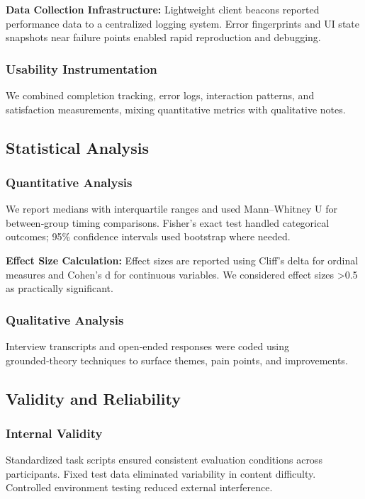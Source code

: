 \documentclass[conference]{IEEEtran}
\begin{document}
\textbf{Data Collection Infrastructure:} Lightweight client beacons reported performance data to a centralized logging system. Error fingerprints and UI state snapshots near failure points enabled rapid reproduction and debugging.

\subsubsection{Usability Instrumentation}
We combined completion tracking, error logs, interaction patterns, and satisfaction measurements, mixing quantitative metrics with qualitative notes.

\subsection{Statistical Analysis}

\subsubsection{Quantitative Analysis}
We report medians with interquartile ranges and used Mann–Whitney U for between‑group timing comparisons. Fisher's exact test handled categorical outcomes; 95\% confidence intervals used bootstrap where needed.

\textbf{Effect Size Calculation:} Effect sizes are reported using Cliff's delta for ordinal measures and Cohen's d for continuous variables. We considered effect sizes >0.5 as practically significant.

\subsubsection{Qualitative Analysis}
Interview transcripts and open‑ended responses were coded using grounded‑theory techniques to surface themes, pain points, and improvements.

\subsection{Validity and Reliability}

\subsubsection{Internal Validity}
Standardized task scripts ensured consistent evaluation conditions across participants. Fixed test data eliminated variability in content difficulty. Controlled environment testing reduced external interference.
\end{document}
